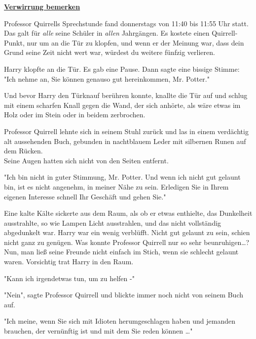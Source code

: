 

\hypertarget{verwirrung-bemerken}{%

\textbf{\uline{Verwirrung bemerken}}

Professor Quirrells Sprechstunde fand donnerstags von 11:40 bis 11:55 Uhr statt. Das galt für \emph{alle} seine Schüler in \emph{allen} Jahrgängen. Es kostete einen Quirrell-Punkt, nur um an die Tür zu klopfen, und wenn er der Meinung war, dass dein Grund seine Zeit nicht wert war, würdest du weitere fünfzig verlieren.

Harry klopfte an die Tür. Es gab eine Pause. Dann sagte eine bissige Stimme:\\ "Ich nehme an, Sie können genauso gut hereinkommen, Mr. Potter."

Und bevor Harry den Türknauf berühren konnte, knallte die Tür auf und schlug mit einem scharfen Knall gegen die Wand, der sich anhörte, als wäre etwas im Holz oder im Stein oder in beidem zerbrochen.

Professor Quirrell lehnte sich in seinem Stuhl zurück und las in einem verdächtig alt aussehenden Buch, gebunden in nachtblauem Leder mit silbernen Runen auf dem Rücken.\\ Seine Augen hatten sich nicht von den Seiten entfernt.

"Ich bin nicht in guter Stimmung, Mr. Potter. Und wenn ich nicht gut gelaunt bin, ist es nicht angenehm, in meiner Nähe zu sein. Erledigen Sie in Ihrem eigenen Interesse schnell Ihr Geschäft und gehen Sie."

Eine kalte Kälte sickerte aus dem Raum, als ob er etwas enthielte, das Dunkelheit ausstrahlte, so wie Lampen Licht ausstrahlen, und das nicht vollständig abgedunkelt war. Harry war ein wenig verblüfft. Nicht gut gelaunt zu sein, schien nicht ganz zu genügen. Was konnte Professor Quirrell nur so sehr beunruhigen…?\\ Nun, man ließ seine Freunde nicht einfach im Stich, wenn sie schlecht gelaunt waren. Vorsichtig trat Harry in den Raum.

"Kann ich irgendetwas tun, um zu helfen -"

"Nein", sagte Professor Quirrell und blickte immer noch nicht von seinem Buch auf.

"Ich meine, wenn Sie sich mit Idioten herumgeschlagen haben und jemanden brauchen, der vernünftig ist und mit dem Sie reden können …"

}
